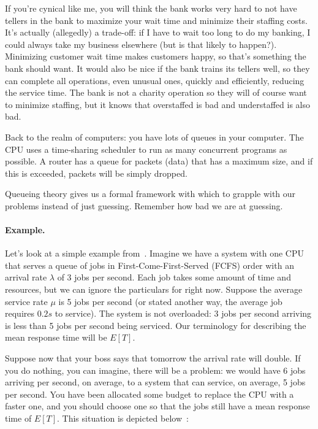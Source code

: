 \documentclass[a4paper]{report}
\begin{document}
If you're cynical like me, you will think the bank works very hard to not have tellers in the bank to maximize your wait time and minimize their staffing costs. It's actually (allegedly) a trade-off: if I have to wait too long to do my banking, I could always take my business elsewhere (but is that likely to happen?). Minimizing customer wait time makes customers happy, so that's something the bank should want. It would also be nice if the bank trains its tellers well, so they can complete all operations, even unusual ones, quickly and efficiently, reducing the service time. The bank is not a charity operation so they will of course want to minimize staffing, but it knows that overstaffed is bad and understaffed is also bad. 

Back to the realm of computers: you have lots of queues in your computer. The CPU uses a time-sharing scheduler to run as many concurrent programs as possible. A router has a queue for packets (data) that has a maximum size, and if this is exceeded, packets will be simply dropped. 

Queueing theory gives us a formal framework with which to grapple with our problems instead of just guessing. Remember how bad we are at guessing. 


\paragraph{Example.} Let's look at a simple example from~\cite{pmd}. Imagine we have a system with one CPU that serves a queue of jobs in First-Come-First-Served (FCFS) order with an arrival rate $\lambda$ of 3 jobs per second. Each job takes some amount of time and resources, but we can ignore the particulars for right now. Suppose the average service rate $\mu$ is 5 jobs per second (or stated another way, the average job requires $0.2s$ to service). The system is not overloaded: 3 jobs per second arriving is less than 5 jobs per second being serviced. Our terminology for describing the mean response time will be $E[T]$. 


Suppose now that your boss says that tomorrow the arrival rate will double. If you do nothing, you can imagine, there will be a problem: we would have 6 jobs arriving per second, on average, to a system that can service, on average, 5 jobs per second. You have been allocated some budget to replace the CPU with a faster one, and you should choose one so that the jobs still have a mean response time of $E[T]$. This situation is depicted below~\cite{pmd}:
\end{document}
